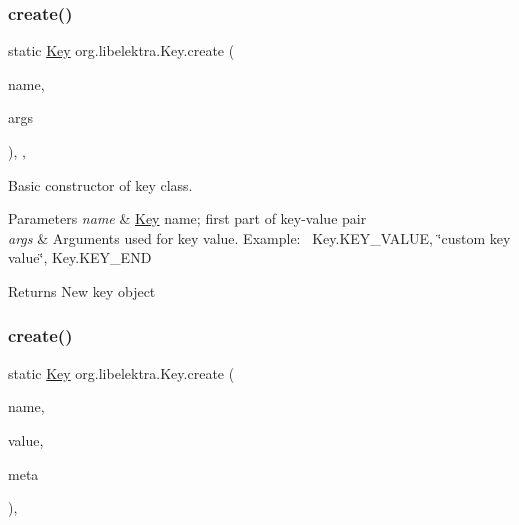 \subsubsection{\texorpdfstring{create()}{create()}\hspace{0.1cm}{\footnotesize\ttfamily [1/3]}}
{\footnotesize\ttfamily static \hyperlink{classorg_1_1libelektra_1_1Key}{Key} org.\+libelektra.\+Key.\+create (\begin{DoxyParamCaption}\item[{final String}]{name,  }\item[{final Object...}]{args }\end{DoxyParamCaption})\hspace{0.3cm}{\ttfamily [inline]}, {\ttfamily [static]}, {\ttfamily [protected]}}



Basic constructor of key class. 


\begin{DoxyParams}{Parameters}
{\em name} & \hyperlink{classorg_1_1libelektra_1_1Key}{Key} name; first part of key-\/value pair \\
\hline
{\em args} & Arguments used for key value. Example\+:~\newline
 Key.\+K\+E\+Y\+\_\+\+V\+A\+L\+UE, \char`\"{}custom key value\char`\"{}, Key.\+K\+E\+Y\+\_\+\+E\+ND \\
\hline
\end{DoxyParams}
\begin{DoxyReturn}{Returns}
New key object 
\end{DoxyReturn}
\mbox{\label{classorg_1_1libelektra_1_1Key_a785f6b8e937d51575a4acc2ebc8f19a2}} 
\subsubsection{\texorpdfstring{create()}{create()}\hspace{0.1cm}{\footnotesize\ttfamily [2/3]}}
{\footnotesize\ttfamily static \hyperlink{classorg_1_1libelektra_1_1Key}{Key} org.\+libelektra.\+Key.\+create (\begin{DoxyParamCaption}\item[{final String}]{name,  }\item[{final Object}]{value,  }\item[{final Key...}]{meta }\end{DoxyParamCaption})\hspace{0.3cm}{\ttfamily [inline]}, {\ttfamily [static]}}



